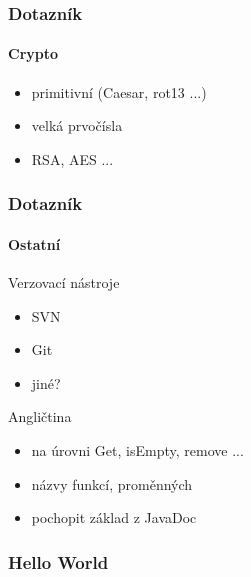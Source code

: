 \documentclass[nologo]{slides}
\begin{document}
\begin{frame}
    \frametitle{Dotazník}
    \framesubtitle{Crypto}

    \begin{itemize}
        \item primitivní (Caesar, rot13 ...)
        \item velká prvočísla
        \item RSA, AES ...

    \end{itemize}

\end{frame}

\begin{frame}
    \frametitle{Dotazník}
    \framesubtitle{Ostatní}

Verzovací nástroje
    \begin{itemize}
        \item SVN
        \item Git
        \item jiné?

    \end{itemize}

Angličtina
    \begin{itemize}
        \item na úrovni Get, isEmpty, remove ...
        \item názvy funkcí, proměnných
        \item pochopit základ z JavaDoc

    \end{itemize}

\end{frame}


\begin{frame}
    \frametitle{Hello World}


\end{frame}
\end{document}
